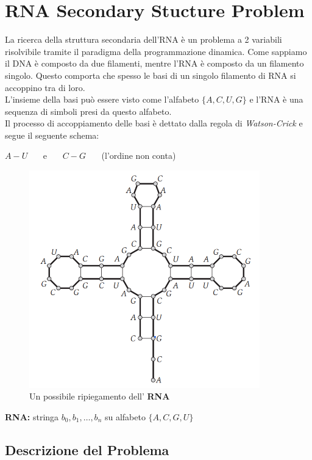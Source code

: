 \chapter{RNA Secondary Stucture Problem}
\label{chap:rna}

La ricerca della struttura secondaria dell'RNA è un problema a 2
variabili risolvibile tramite il paradigma della programmazione
dinamica. Come sappiamo il DNA è composto da due filamenti, mentre l'RNA
è composto da un filamento singolo. Questo comporta che spesso le basi
di un singolo filamento di RNA si accoppino tra di loro.\\

L'insieme della basi può essere visto come l'alfabeto $\{A, C, U, G\}$
e l'RNA è una sequenza di simboli presi da questo alfabeto.\\

Il processo di accoppiamento delle basi è dettato dalla regola di
\emph{Watson-Crick} e segue il seguente schema:

\begin{center}
  $A-U$ \ \ \ e \ \ \ $C-G$ \ \ \ (l'ordine non conta)
\end{center}


\begin{figure}[H]
  \centering
  \includegraphics[width=10cm, keepaspectratio]{capitoli/programmazione_dinamica/imgs/rna1.png}
  \caption{Un possibile ripiegamento dell' \textbf{RNA}}
\end{figure}


\textbf{RNA:} stringa $b_0,b_1, \ldots, b_n$ su alfabeto $\{A, C, G, U\}$

\section{Descrizione del Problema}

